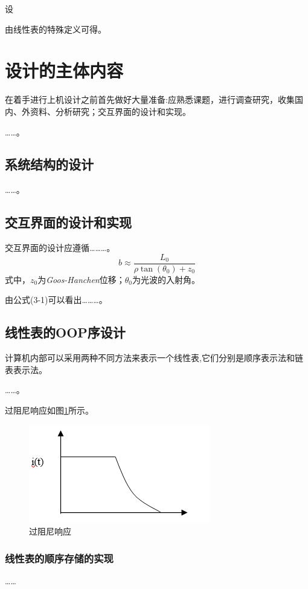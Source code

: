 \begin{mlma}
设
\begin{mpro}
由线性表的特殊定义可得。
\end{mpro}
\end{mlma}



\section{设计的主体内容}
在着手进行上机设计之前首先做好大量准备:应熟悉课题，进行调查研究，收集国内、外资料、分析研究；交互界面的设计和实现。

……。
\subsection{系统结构的设计}
……。
\subsection{交互界面的设计和实现}
交互界面的设计应遵循………。
\begin{equation}
        b\approx\frac{L_0}{\rho\tan(\theta_0)+z_0}
\end{equation}
式中，$z_0$为\textit{Goos-Hanchen}位移；$\theta_0$为光波的入射角。

由公式(3-1)可以看出………。
\subsection{线性表的OOP序设计}
计算机内部可以采用两种不同方法来表示一个线性表,它们分别是顺序表示法和链表表示法。

……。

过阻尼响应如图\ref{guozuni}所示。
\begin{figure}[htbp]
\centering

\includegraphics{./figure/guozuni.png}
\caption{过阻尼响应}
\label{guozuni}
\end{figure}
\subsubsection{线性表的顺序存储的实现}
……


